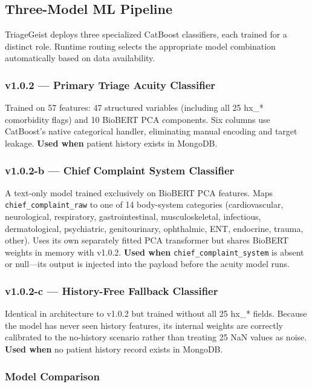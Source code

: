 \documentclass[conference]{IEEEtran}
\begin{document}
\subsection{Three-Model ML Pipeline}

TriageGeist deploys three specialized CatBoost classifiers, each trained for a distinct role. Runtime routing selects the appropriate model combination automatically based on data availability.

\subsubsection{v1.0.2 --- Primary Triage Acuity Classifier}
Trained on 57 features: 47 structured variables (including all 25 hx\_* comorbidity flags) and 10 BioBERT PCA components. Six columns use CatBoost's native categorical handler, eliminating manual encoding and target leakage. \textbf{Used when} patient history exists in MongoDB.

\subsubsection{v1.0.2-b --- Chief Complaint System Classifier}
A text-only model trained exclusively on BioBERT PCA features. Maps \texttt{chief\_complaint\_raw} to one of 14 body-system categories (cardiovascular, neurological, respiratory, gastrointestinal, musculoskeletal, infectious, dermatological, psychiatric, genitourinary, ophthalmic, ENT, endocrine, trauma, other). Uses its own separately fitted PCA transformer but shares BioBERT weights in memory with v1.0.2. \textbf{Used when} \texttt{chief\_complaint\_system} is absent or null---its output is injected into the payload before the acuity model runs.

\subsubsection{v1.0.2-c --- History-Free Fallback Classifier}
Identical in architecture to v1.0.2 but trained without all 25 hx\_* fields. Because the model has never seen history features, its internal weights are correctly calibrated to the no-history scenario rather than treating 25 NaN values as noise. \textbf{Used when} no patient history record exists in MongoDB.

\subsubsection{Model Comparison}
\end{document}
